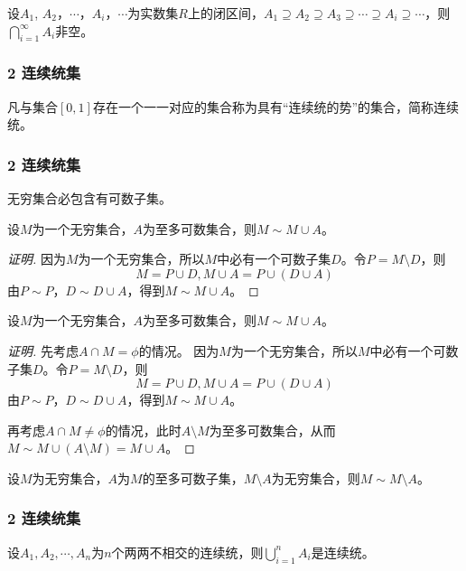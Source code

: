\documentclass{beamer}
\begin{document}
\begin{CJK*}{UTF8}{gbsn}
\begin{frame}[t]
  设$A_1$, $A_2$，$\cdots$，$A_i$，$\cdots$为实数集$R$上的闭区间，$A_1\supseteq A_2 \supseteq A_3 \supseteq \cdots \supseteq A_i \supseteq \cdots$，则$\bigcap_{i=1}^{\infty}A_i$非空。
\end{frame}

\begin{frame}[t]
  \frametitle{2 连续统集}
  \begin{Def}
    凡与集合$[0,1]$存在一个一一对应的集合称为具有“连续统的势”的集合，简称\alert{连续统}。
  \end{Def}
\end{frame}

\begin{frame}[t]
  \frametitle{2 连续统集}
  \begin{Thm}
    无穷集合必包含有可数子集。
  \end{Thm}
\end{frame}
\begin{frame}[t]
  \begin{Thm}
    设$M$为一个无穷集合，$A$为至多可数集合，则$M \sim M \cup A$。
  \end{Thm}\pause
  \begin{proof}[证明]
    因为$M$为一个无穷集合，所以$M$中必有一个可数子集$D$。令$P=M\setminus D$，则
    \[M=P\cup D, M\cup A = P\cup (D\cup A)\]
    由$P\sim P$，$D\sim D\cup A$，得到$M\sim M\cup A$。
  \end{proof}
\end{frame}
\begin{frame}[t]
  \begin{Thm}
    设$M$为一个无穷集合，$A$为至多可数集合，则$M \sim M \cup A$。
  \end{Thm}
  \begin{proof}[证明]
    先考虑$A\cap M=\phi$的情况。
    因为$M$为一个无穷集合，所以$M$中必有一个可数子集$D$。令$P=M\setminus D$，则
    \[M=P\cup D, M\cup A = P\cup (D\cup A)\]
    由$P\sim P$，$D\sim D\cup A$，得到$M\sim M\cup A$。

    再考虑$A\cap M\neq \phi$的情况，此时$A\setminus M$为至多可数集合，从而$M\sim M\cup(A\setminus M)=M\cup A$。
  \end{proof}
\end{frame}

\begin{frame}[t]
  \begin{Thm}
    设$M$为无穷集合，$A$为$M$的至多可数子集，$M\setminus A$为无穷集合，则$M \sim M\setminus A$。
  \end{Thm}
\end{frame}
\begin{frame}[t]
  \frametitle{2 连续统集}
  \begin{Thm}
    设$A_1, A_2, \cdots, A_n$为$n$个两两不相交的连续统，则$\bigcup_{i=1}^nA_i$是连续统。
  \end{Thm}
\end{frame}


\end{CJK*}
\end{document}
